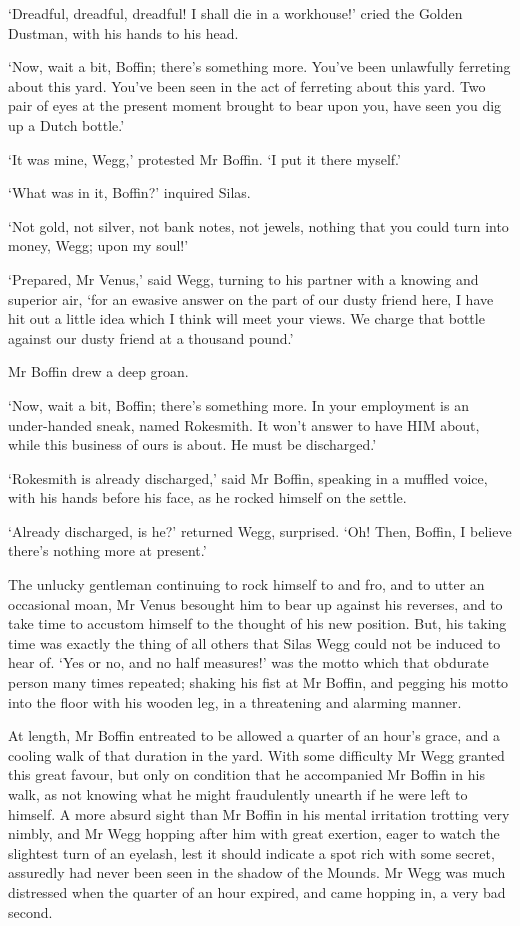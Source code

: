 ‘Dreadful, dreadful, dreadful! I shall die in a workhouse!’ cried the
Golden Dustman, with his hands to his head.

‘Now, wait a bit, Boffin; there’s something more. You’ve been unlawfully
ferreting about this yard. You’ve been seen in the act of ferreting
about this yard. Two pair of eyes at the present moment brought to bear
upon you, have seen you dig up a Dutch bottle.’

‘It was mine, Wegg,’ protested Mr Boffin. ‘I put it there myself.’

‘What was in it, Boffin?’ inquired Silas.

‘Not gold, not silver, not bank notes, not jewels, nothing that you
could turn into money, Wegg; upon my soul!’

‘Prepared, Mr Venus,’ said Wegg, turning to his partner with a knowing
and superior air, ‘for an ewasive answer on the part of our dusty friend
here, I have hit out a little idea which I think will meet your views.
We charge that bottle against our dusty friend at a thousand pound.’

Mr Boffin drew a deep groan.

‘Now, wait a bit, Boffin; there’s something more. In your employment
is an under-handed sneak, named Rokesmith. It won’t answer to have HIM
about, while this business of ours is about. He must be discharged.’

‘Rokesmith is already discharged,’ said Mr Boffin, speaking in a muffled
voice, with his hands before his face, as he rocked himself on the
settle.

‘Already discharged, is he?’ returned Wegg, surprised. ‘Oh! Then,
Boffin, I believe there’s nothing more at present.’

The unlucky gentleman continuing to rock himself to and fro, and to
utter an occasional moan, Mr Venus besought him to bear up against his
reverses, and to take time to accustom himself to the thought of his new
position. But, his taking time was exactly the thing of all others that
Silas Wegg could not be induced to hear of. ‘Yes or no, and no half
measures!’ was the motto which that obdurate person many times repeated;
shaking his fist at Mr Boffin, and pegging his motto into the floor with
his wooden leg, in a threatening and alarming manner.

At length, Mr Boffin entreated to be allowed a quarter of an hour’s
grace, and a cooling walk of that duration in the yard. With some
difficulty Mr Wegg granted this great favour, but only on condition
that he accompanied Mr Boffin in his walk, as not knowing what he might
fraudulently unearth if he were left to himself. A more absurd sight
than Mr Boffin in his mental irritation trotting very nimbly, and Mr
Wegg hopping after him with great exertion, eager to watch the slightest
turn of an eyelash, lest it should indicate a spot rich with some
secret, assuredly had never been seen in the shadow of the Mounds. Mr
Wegg was much distressed when the quarter of an hour expired, and came
hopping in, a very bad second.

